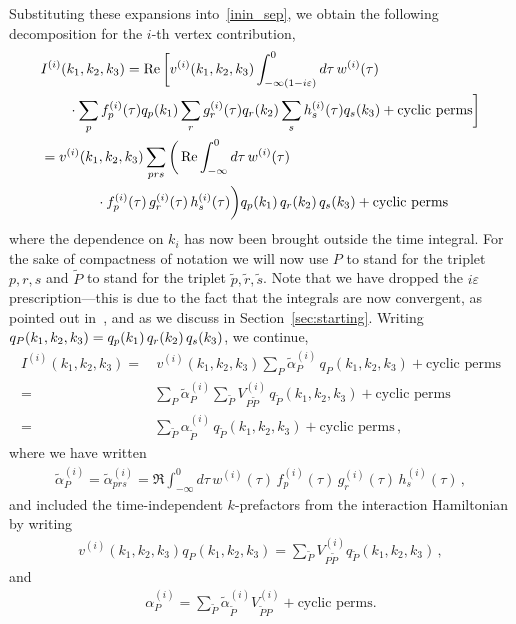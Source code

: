 Substituting these expansions into~\eqref{inin_sep}, we obtain the following decomposition for the $i$-th vertex contribution,
\begin{align}\label{inin_kdep}
    &I^{(i)}(k_1,k_2,k_3)
    = \operatorname{Re}\bigg[v^{(i)}(k_1, k_2,k_3)\int^0_{-\infty(1-i\varepsilon)} d\tau\, w^{(i)}(\tau)\nonumber\\
    &\qquad\cdot\sum_p f_p^{(i)}(\tau) q_p(k_1)\sum_r g_r^{(i)}(\tau) q_r(k_2)\sum_s h_s^{(i)}(\tau) q_s(k_3) + \text{cyclic perms}\bigg]\\
	&= v^{(i)}(k_1, k_2,k_3)\sum_{prs}\bigg(\operatorname{Re}\int^0_{-\infty} d\tau\, w^{(i)}(\tau)\nonumber\\
    &\qquad\qquad\cdot f_p^{(i)}(\tau)\, g_r^{(i)}(\tau) \,h_s^{(i)}(\tau)\bigg)q_p(k_1)\,q_r(k_2)\,q_s(k_3) + \text{cyclic perms}
\end{align}
where the dependence on $k_i$ has now been brought outside the time integral.
For the sake of compactness of notation we will now use $P$ to stand for the
triplet $p,r,s$ and $\tilde{P}$ to stand for the triplet $\tilde{p},\tilde{r},\tilde{s}$.
Note that we have dropped the $i\varepsilon$ prescription---this is due to the fact that the
integrals are now convergent, as pointed out in~\cite{Funakoshi}, and as we discuss in Section~\ref{sec:starting}.
Writing $q_{P}(k_1,k_2,k_3)=q_p(k_1)\,q_r(k_2)\,q_s(k_3)$,
we continue,
\begin{align}\label{inin_kdep_cont}
    I^{(i)}(k_1,k_2,k_3) =&\, v^{(i)}(k_1, k_2,k_3) \sum_{P} \tilde{\alpha}_{P}^{(i)}\,  q_{P}(k_1,k_2,k_3) + \text{cyclic perms}\nonumber\\
    =& \sum_{P} \tilde{\alpha}_{P}^{(i)}\sum_{\tilde{P}}V^{(i)}_{P\tilde{P}}\,  q_{\tilde{P}}(k_1,k_2,k_3) + \text{cyclic perms}\nonumber\\
    =& \sum_{\tilde{P}} \alpha_{\tilde{P}}^{(i)}\,  q_{\tilde{P}}(k_1,k_2,k_3) + \text{cyclic perms} \,,
\end{align}
where we have written
\begin{align}\label{inin_kindep}
\tilde{\alpha}_P^{(i)} =  \tilde{\alpha}_{prs}^{(i)} 	= \Re\int^0_{-\infty} d\tau\, w^{(i)}(\tau)\, f_p^{(i)}(\tau) \,g_r^{(i)}(\tau) \,h_s^{(i)}(\tau)\,,
\end{align}
and included the time-independent $k$-prefactors from the interaction Hamiltonian by writing
\begin{align}\label{V_definition}
    v^{(i)}(k_1, k_2,k_3)q_P(k_1,k_2,k_3) = \sum_{\tilde{P}}V^{(i)}_{P\tilde{P}}q_{\tilde{P}}(k_1,k_2,k_3)\,,
\end{align}
and
\begin{align}
    \alpha_P^{(i)} = \sum_{\tilde{P}} \tilde{\alpha}_{\tilde{P}}^{(i)}V^{(i)}_{\tilde{P}P} + \text{cyclic perms}.
\end{align}
